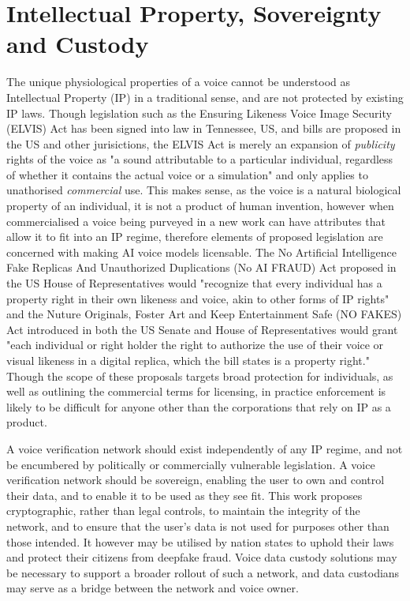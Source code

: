 \documentclass[11pt,a4paper]{article}
\begin{document}
\section{Intellectual Property, Sovereignty and Custody}
\label{sec:conclusion}
The unique physiological properties of a voice cannot be understood as Intellectual Property (IP) in a traditional sense, and are not protected by existing IP laws.
Though legislation such as the Ensuring Likeness Voice Image Security (ELVIS) Act \cite{elvis2024act} has been signed into law in Tennessee, US, and bills are proposed in the US and other jurisictions, the ELVIS Act is merely an expansion of \textit{publicity} rights of the voice as "a sound attributable to a particular individual, regardless of whether it contains the actual voice or a simulation" and only applies to unathorised \textit{commercial} use.
This makes sense, as the voice is a natural biological property of an individual, it is not a product of human invention, however when commercialised a voice being purveyed in a new work can have attributes that allow it to fit into an IP regime, therefore elements of proposed legislation are concerned with making AI voice models licensable.
The No Artificial Intelligence Fake Replicas And Unauthorized Duplications (No AI FRAUD) Act \cite{noaifraud2024act} proposed in the US House of Representatives would "recognize that every individual has a property right in their own likeness and voice, akin to other forms of IP rights" and the Nuture Originals, Foster Art and Keep Entertainment Safe (NO FAKES) Act \cite{nofakes2024act} introduced in both the US Senate and House of Representatives would grant "each individual or right holder the right to authorize the use of their voice or visual likeness in a digital replica, which the bill states is a property right."
Though the scope of these proposals targets broad protection for individuals, as well as outlining the commercial terms for licensing, in practice enforcement is likely to be difficult for anyone other than the corporations that rely on IP as a product.

A voice verification network should exist independently of any IP regime, and not be encumbered by politically or commercially vulnerable legislation.
A voice verification network should be sovereign, enabling the user to own and control their data, and to enable it to be used as they see fit.
This work proposes cryptographic, rather than legal controls, to maintain the integrity of the network, and to ensure that the user's data is not used for purposes other than those intended.
It however may be utilised by nation states to uphold their laws and protect their citizens from deepfake fraud.
Voice data custody solutions may be necessary to support a broader rollout of such a network, and data custodians may serve as a bridge between the network and voice owner.
\end{document}
